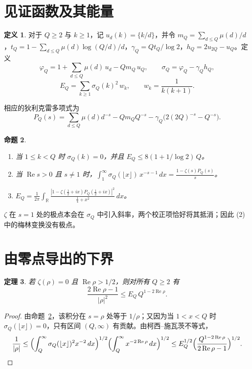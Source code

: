 \documentclass[11pt,a4paper]{amsart}
\newtheorem{teorema}{定理}
\newtheorem{proposicion}[teorema]{命题}
\theoremstyle{definition}
\newtheorem{definicion}[teorema]{定义}
\theoremstyle{remark}
\renewcommand{\Re}{\operatorname{Re}}
\begin{document}
\section{见证函数及其能量}

\begin{definicion}
对于 $Q\ge2$ 与 $k\ge1$，记 $u_d(k)=\{k/d\}$，并令 $m_Q=\sum_{d\le Q}\mu(d)/d$，$t_Q=1-\sum_{d\le Q}\mu(d)\log(Q/d)/d$，$\gamma_Q=Qt_Q/\log2$，$h_Q=2u_{2Q}-u_Q$。定义
\[
\varphi_Q=1+\sum_{d\le Q}\mu(d)\,u_d-Qm_Q\,u_Q,\qquad
\sigma_Q=\varphi_Q-\gamma_Q h_Q,
\]
\[
E_Q=\sum_{k\ge1}\sigma_Q(k)^2\,w_k,\qquad w_k=\frac1{k(k+1)}.
\]
\end{definicion}

相应的狄利克雷多项式为
\[
P_Q(s)=\sum_{d\le Q}\mu(d)d^{-s}-Qm_QQ^{-s}-\gamma_Q\bigl(2(2Q)^{-s}-Q^{-s}\bigr).
\]

\begin{proposicion}\label{prop:mellin}
\begin{enumerate}
\item 当 $1\le k<Q$ 时 $\sigma_Q(k)=0$，并且 $E_Q\le 8(1+1/\log2)\,Q$。
\item 当 $\Re s>0$ 且 $s\ne1$ 时，$\displaystyle\int_1^\infty\sigma_Q(\lfloor x\rfloor)\,x^{-s-1}\,dx=\frac{1-\zeta(s)P_Q(s)}{s}$。
\item $\displaystyle E_Q=\frac1{2\pi}\int_{\mathbb R}\frac{|1-\zeta(\tfrac12+ix)P_Q(\tfrac12+ix)|^2}{\tfrac14+x^2}\,dx$。
\end{enumerate}
\end{proposicion}

$\zeta$ 在 $s=1$ 处的极点本会在 $\sigma_Q$ 中引入斜率，两个校正项恰好将其抵消；因此 (2) 中的梅林变换没有极点。

\section{由零点导出的下界}

\begin{teorema}\label{teo:recip}
若 $\zeta(\rho)=0$ 且 $\Re\rho>1/2$，则对所有 $Q\ge2$ 有
\[
\frac{2\Re\rho-1}{|\rho|^2}\le E_Q\,Q^{1-2\Re\rho}.
\]
\end{teorema}

\begin{proof}
由命题~\ref{prop:mellin}，该积分在 $s=\rho$ 处等于 $1/\rho$；又因为当 $1<x<Q$ 时 $\sigma_Q(\lfloor x\rfloor)=0$，只有区间 $(Q,\infty)$ 有贡献。由柯西--施瓦茨不等式，
\[
\frac1{|\rho|}\le\Bigl(\int_Q^\infty\sigma_Q(\lfloor x\rfloor)^2x^{-2}\,dx\Bigr)^{1/2}\Bigl(\int_Q^\infty x^{-2\Re\rho}\,dx\Bigr)^{1/2}
\le E_Q^{1/2}\Bigl(\frac{Q^{1-2\Re\rho}}{2\Re\rho-1}\Bigr)^{1/2}.\qedhere
\]
\end{proof}
\end{document}
